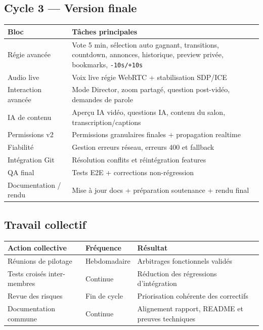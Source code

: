 \documentclass[11pt,a4paper]{report}
\begin{document}
\subsection{Cycle 3 --- Version finale}
\begin{longtable}{L{0.28\textwidth} L{0.60\textwidth}}
\toprule
{}
\textbf{Bloc} & \textbf{Tâches principales} \\
\midrule
Régie avancée & Vote 5 min, sélection auto gagnant, transitions, countdown, annonces, historique, preview privée, bookmarks, \texttt{-10s/+10s} \\
Audio live & Voix live régie WebRTC + stabilisation SDP/ICE \\
Interaction avancée & Mode Director, zoom partagé, question post-vidéo, demandes de parole \\
IA de contenu & Aperçu IA vidéo, questions IA, contenu du salon, transcription/captions \\
Permissions v2 & Permissions granulaires finales + propagation realtime \\
Fiabilité & Gestion erreurs réseau, erreurs 400 et fallback \\
Intégration Git & Résolution conflits et réintégration features \\
QA final & Tests E2E + corrections non-régression \\
Documentation / rendu & Mise à jour docs + préparation soutenance + rendu final \\
\bottomrule
\end{longtable}

\subsection{Travail collectif}
\begin{longtable}{L{0.30\textwidth} C{0.18\textwidth} L{0.42\textwidth}}
\toprule
{}
\textbf{Action collective} & \textbf{Fréquence} & \textbf{Résultat} \\
\midrule
Réunions de pilotage & Hebdomadaire & Arbitrages fonctionnels validés \\
Tests croisés inter-membres & Continue & Réduction des régressions d'intégration \\
Revue des risques & Fin de cycle & Priorisation cohérente des correctifs \\
Documentation commune & Continue & Alignement rapport, README et preuves techniques \\
\bottomrule
\end{longtable}
\end{document}
